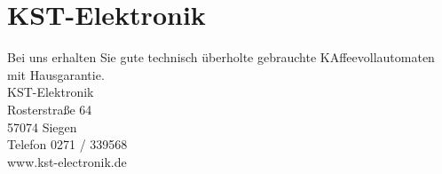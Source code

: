 \section{KST-Elektronik}
Bei uns erhalten Sie gute technisch überholte gebrauchte KAffeevollautomaten mit Hausgarantie. \\
KST-Elektronik\\
Rosterstraße 64\\
57074 Siegen\\
Telefon 0271 / 339568\\
www.kst-electronik.de\\
